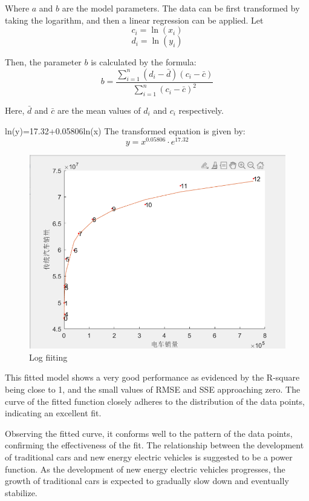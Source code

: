 \documentclass{apmcmthesis}
\begin{document}
Where \( a \) and \( b \) are the model parameters. The data can be first transformed by taking the logarithm, and then a linear regression can be applied. Let
\[ c_i = \ln(x_i) \]
\[ d_i = \ln(y_i) \]

Then, the parameter \( b \) is calculated by the formula:
\[ b = \frac{\sum_{i=1}^n (d_i - \bar{d})(c_i - \bar{c})}{\sum_{i=1}^n (c_i - \bar{c})^2} \]

Here, \( \bar{d} \) and \( \bar{c} \) are the mean values of \( d_i \) and \( c_i \) respectively.

ln(y)=17.32+0.05806ln(x)
The transformed equation is given by:
\[ y = x^{0.05806} \cdot e^{17.32} \]

\begin{figure}[htbp]
    \centering
    \includegraphics[scale=0.5]{figures/Figure/log.png}
    \caption{Log fiiting}
\end{figure}
This fitted model shows a very good performance as evidenced by the R-square being close to 1, and the small values of RMSE and SSE approaching zero. The curve of the fitted function closely adheres to the distribution of the data points, indicating an excellent fit.

Observing the fitted curve, it conforms well to the pattern of the data points, confirming the effectiveness of the fit. The relationship between the development of traditional cars and new energy electric vehicles is suggested to be a power function. As the development of new energy electric vehicles progresses, the growth of traditional cars is expected to gradually slow down and eventually stabilize.
\end{document}
